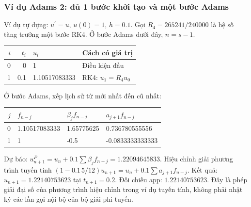\examplebreak
\subsubsection*{Ví dụ Adams 2: đủ 1 bước khởi tạo và một bước Adams}
Ví dụ tự dựng: $u^{\prime}=u$, $u(0)=1$, $h=0.1$. Gọi $R_4=265241/240000$ là hệ số tăng trưởng một bước RK4. Ở bước Adams dưới đây, $n=s-1$.
\begin{center}\begin{tabular}{rrll}\toprule $i$&$t_i$&$u_i$&Cách có giá trị\\\midrule
0&0&1&Điều kiện đầu\\
1&0.1&1.10517083333&RK4: $u_1 = R_4u_{0}$\\
\bottomrule\end{tabular}\end{center}
Ở bước Adams, xếp lịch sử từ mới nhất đến cũ nhất:
\begin{center}\begin{tabular}{rlll}\toprule $j$&$f_{n-j}$&$\beta_jf_{n-j}$&$a_{j+1}f_{n-j}$\\\midrule
0&1.10517083333&1.65775625&0.736780555556\\
1&1&-0.5&-0.0833333333333\\
\bottomrule\end{tabular}\end{center}
Dự báo: $u_{n+1}^P=u_n+0.1\sum\beta_jf_{n-j}=1.22094645833$.
Hiệu chỉnh giải phương trình tuyến tính $(1-0.1\,5/12)u_{n+1}=u_n+0.1\sum a_{j+1}f_{n-j}$.
Kết quả: $u_{n+1}=1.22140753623$ tại $t_{n+1}=0.2$. Đối chiếu app: $1.22140753623$.
Đây là phép giải đại số của phương trình hiệu chỉnh trong ví dụ tuyến tính, không phải nhật ký các lần gọi nội bộ của bộ giải phi tuyến.
\examplebreak
